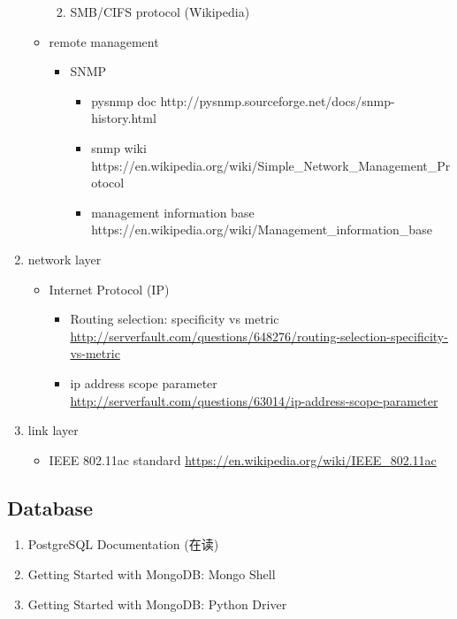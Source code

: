 \documentclass{article}
\begin{document}
\begin{enumerate}
\begin{itemize}
\begin{enumerate}
\begin{enumerate}
                        \end{enumerate}
                    \item SMB/CIFS protocol (Wikipedia)
                \end{enumerate}
            \item remote management
                \begin{itemize}
                    \item SNMP
                        \begin{itemize}
                            \item pysnmp doc http://pysnmp.sourceforge.net/docs/snmp-history.html
                            \item snmp wiki https://en.wikipedia.org/wiki/Simple_Network_Management_Protocol
                            \item management information base https://en.wikipedia.org/wiki/Management_information_base
                        \end{itemize}
                \end{itemize}
        \end{itemize}
    \item network layer
        \begin{itemize}
            \item Internet Protocol (IP)
                \begin{itemize}
                    \item Routing selection: specificity vs metric
                        \url{http://serverfault.com/questions/648276/routing-selection-specificity-vs-metric}
                    \item ip address scope parameter
                        \url{http://serverfault.com/questions/63014/ip-address-scope-parameter}
                \end{itemize}
        \end{itemize}
    \item link layer
        \begin{itemize}
            \item IEEE 802.11ac standard \url{https://en.wikipedia.org/wiki/IEEE_802.11ac}
        \end{itemize}
\end{enumerate}
\subsection{Database}
\begin{enumerate}
    \item PostgreSQL Documentation (在读)
    \item Getting Started with MongoDB: Mongo Shell
    \item Getting Started with MongoDB: Python Driver
\end{enumerate}
\end{document}
